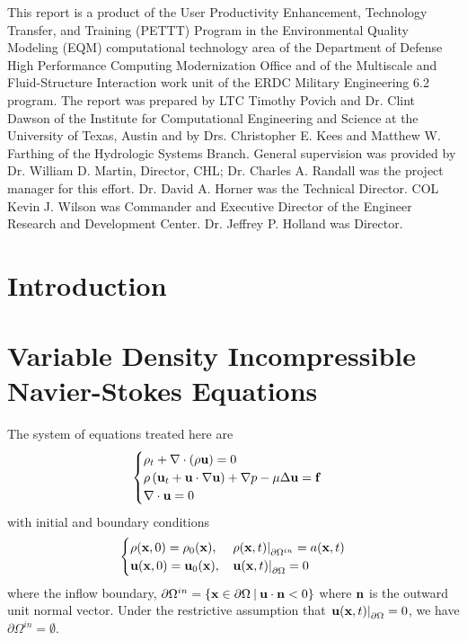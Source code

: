 \documentclass[letterpaper]{erdc}
\begin{document}
This report is a product of the User Productivity Enhancement,
Technology Transfer, and Training (PETTT) Program in the Environmental
Quality Modeling (EQM) computational technology area of the Department
of Defense High Performance Computing Modernization Office and of the
Multiscale and Fluid-Structure Interaction work unit of the ERDC
Military Engineering 6.2 program. The report was prepared by LTC
Timothy Povich and Dr. Clint Dawson of the Institute for Computational
Engineering and Science at the University of Texas, Austin and by
Drs. Christopher E. Kees and Matthew W. Farthing of the Hydrologic
Systems Branch.  General supervision was provided by Dr. William
D. Martin, Director, CHL; Dr. Charles A. Randall was the project
manager for this eﬀort. Dr. David A. Horner was the Technical
Director. COL Kevin J. Wilson was Commander and Executive Director of
the Engineer Research and Development Center. Dr. Jeffrey P. Holland
was Director.

\mainmatter

\chapter{Introduction}


%
%
%
%
\chapter{Variable Density Incompressible Navier-Stokes Equations}

The system of equations treated here are
\begin{equation}\label{eqn:variabledensityNavierStokes}
  \begin{cases}
    \rho_t + \nabla\cdot\left( \rho \textbf{u}\right) = 0 &\\
    \rho\left(\textbf{u}_t + \textbf{u}\cdot\nabla\textbf{u}  \right) + \nabla p - \mu\Delta \textbf{u} = \textbf{f} &\\
    \nabla\cdot \textbf{u} = 0
  \end{cases}
\end{equation}
with initial and boundary conditions
\begin{equation}\label{eqn:variabledensityNavierStokesBCIC}
  \begin{cases}
    \rho(\textbf{x},0) = \rho_0(\textbf{x}), & \left.\rho(\textbf{x},t)\right|_{\partial\Omega^{in}} = a(\textbf{x},t)\\
    \textbf{u}(\textbf{x},0) = \textbf{u}_0(\textbf{x}), & \left.\textbf{u}(\textbf{x},t)\right|_{\partial\Omega} = 0
  \end{cases}
\end{equation}
where the inflow boundary, $\partial\Omega^{in} = \{ \textbf{x}\in \partial\Omega \:|\: \textbf{u}\cdot\textbf{n} <0 \}$ where $\textbf{n}$ is the outward unit normal vector.  Under the restrictive assumption that $\left.\textbf{u}(\textbf{x},t)\right|_{\partial\Omega} = 0$, we have $\partial\Omega^{in}= \emptyset$.
\end{document}
